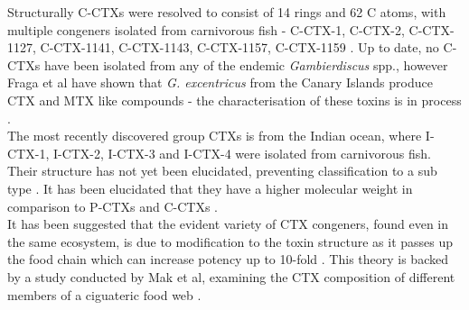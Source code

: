 \documentclass[12pt]{article}
\begin{document}
Structurally C-CTXs were resolved to consist of 14 rings and 62 C atoms, with multiple congeners isolated from carnivorous fish - C-CTX-1, C-CTX-2, C-CTX-1127, C-CTX-1141, C-CTX-1143, C-CTX-1157, C-CTX-1159 \citep{vernoux1997isolation,lewis1998structure,pottier2003identification,pottier2002characterisation}. Up to date, no C-CTXs have been isolated from any of the endemic \emph{Gambierdiscus} spp., however Fraga et al have shown that \emph{G. excentricus} from the Canary Islands produce CTX and MTX like compounds - the characterisation of these toxins is in process \citep{fraga2011gambierdiscus}. \\
The most recently discovered group CTXs is from the Indian ocean, where I-CTX-1, I-CTX-2, I-CTX-3 and I-CTX-4 were isolated from carnivorous fish. Their structure has not yet been elucidated, preventing classification to a sub type \citep{hamilton2002multiple,hamilton2002isolation}. It has been elucidated that they have a higher molecular weight in comparison to P-CTXs and C-CTXs \citep{caillaud2010update,hamilton2002multiple,hamilton2002isolation}. \\ %

It has been suggested that the evident variety of CTX congeners, found even in the same ecosystem, is due to modification to the toxin structure as it passes up the food chain which can increase potency up to 10-fold \citep{hokama1996human,lewis2006ciguatera}. This theory is backed by a study conducted by Mak et al, examining the CTX composition of different members of a ciguateric food web \citep{mak2013pacific}.

\end{document}
